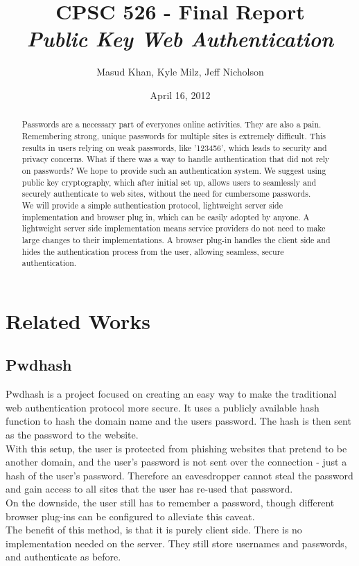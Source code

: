 \documentclass[11pt]{article}
\begin{document}
\title{\bf CPSC 526 - Final Report \\ \emph{Public Key Web Authentication}}
\author{Masud Khan, Kyle Milz, Jeff Nicholson}
\date{April 16, 2012} 
\maketitle

\tableofcontents
\pagebreak
\begin{abstract}
Passwords are a necessary part of everyones online activities. They are also a pain. Remembering strong, unique passwords for multiple sites is extremely difficult. This results in users relying on weak passwords, like '123456', which leads to security and privacy concerns. What if there was a way to handle authentication that did not rely on passwords? We hope to provide such an authentication system. We suggest using public key cryptography, which after initial set up, allows users to seamlessly and securely authenticate to web sites, without the need for cumbersome passwords.\\
We will provide a simple authentication protocol, lightweight server side implementation and browser plug in, which can be easily adopted by anyone. A lightweight server side implementation means service providers do not need to make large changes to their implementations. A browser plug-in handles the client side and hides the authentication process from the user, allowing seamless, secure authentication.
\end{abstract}
\pagebreak

\section{Related Works} \label{sec:relatedWorks}
\subsection{Pwdhash} 
Pwdhash\cite{pwdhash} is a project focused on creating an easy way to make the traditional web authentication protocol more secure. It uses a publicly available hash function to hash the domain name and the users password. The hash is then sent as the password to the website.\\
	With this setup, the user is protected from phishing websites that pretend to be another domain, and the user’s password is not sent over the connection - just a hash of the user's password. Therefore an eavesdropper cannot steal the password and gain access to all sites that the user has re-used that password.\\
	On the downside, the user still has to remember a password, though different browser plug-ins can be configured to alleviate this caveat.\\
The benefit of this method, is that it is purely client side. There is no implementation needed on the server. They still store usernames and passwords, and authenticate as before.
\end{document}
